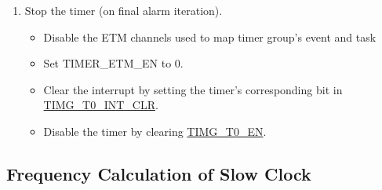 \documentclass[main\_\_EN.tex]{subfiles}
\begin{document}
\begin{enumerate}
\begin{itemize}
    \end{itemize}
    \item Stop the timer (on final alarm iteration).
    \begin{itemize}
        \item Disable the ETM channels used to map timer group's event and task
        \item Set TIMER\_ETM\_EN to 0.
        \item Clear the interrupt by setting the timer's corresponding bit in \hyperref[fielddesc:TIMGT0INTCLR]{TIMG\_T0\_INT\_CLR}.
        \item Disable the timer by clearing \hyperref[fielddesc:TIMGTXEN]{TIMG\_T0\_EN}.
    \end{itemize}
\end{enumerate}

\subsection{Frequency Calculation of Slow Clock}
\label{sec:rtc-calibration-procedure}
\end{document}
